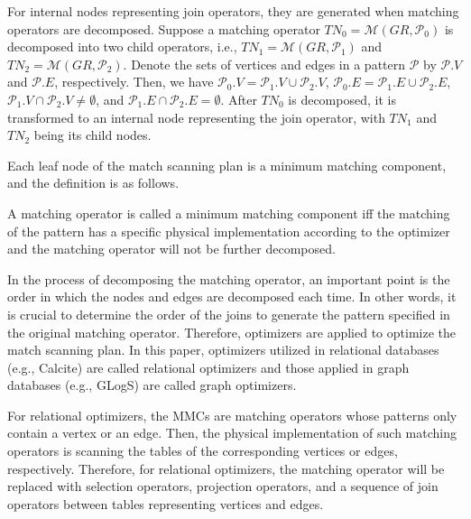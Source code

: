 For internal nodes representing join operators, they are generated when matching operators are decomposed.
Suppose a matching operator $TN_0 = \mathcal{M}(GR, \mathcal{P}_0)$ is decomposed into two child operators, i.e., $TN_1 = \mathcal{M}(GR, \mathcal{P}_1)$ and $TN_2 = \mathcal{M}(GR, \mathcal{P}_2)$.
Denote the sets of vertices and edges in a pattern $\mathcal{P}$ by $\mathcal{P}.V$ and $\mathcal{P}.E$, respectively.
Then, we have $\mathcal{P}_0.V = \mathcal{P}_1.V \cup \mathcal{P}_2.V$, $\mathcal{P}_0.E = \mathcal{P}_1.E \cup \mathcal{P}_2.E$, $\mathcal{P}_1.V \cap \mathcal{P}_2.V \neq \emptyset$, and $\mathcal{P}_1.E \cap \mathcal{P}_2.E = \emptyset$.
After $TN_0$ is decomposed, it is transformed to an internal node representing the join operator, with $TN_1$ and $TN_2$ being its child nodes.


Each leaf node of the match scanning plan is a minimum matching component, and the definition is as follows.

\begin{definition}
    A matching operator is called a minimum matching component iff the matching of the pattern has a specific physical implementation according to the optimizer and the matching operator will not be further decomposed.
\end{definition}

In the process of decomposing the matching operator, an important point is the order in which the nodes and edges are decomposed each time.
In other words, it is crucial to determine the order of the joins to generate the pattern specified in the original matching operator.
Therefore, optimizers are applied to optimize the match scanning plan.
In this paper, optimizers utilized in relational databases (e.g., Calcite) are called relational optimizers and those applied in graph databases (e.g., GLogS) are called graph optimizers.

For relational optimizers, the MMCs are matching operators whose patterns only contain a vertex or an edge.
Then, the physical implementation of such matching operators is scanning the tables of the corresponding vertices or edges, respectively.
Therefore, for relational optimizers, the matching operator will be replaced with selection operators, projection operators, and a sequence of join operators between tables representing vertices and edges.

